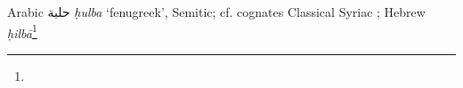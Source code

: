 \begin{etymology}\label{ety:hulba}
Arabic {حلبة} \textit{ḥulba} `fenugreek', Semitic; cf. cognates Classical Syriac ; Hebrew ‎ \textit{ḥilbā}\footnote{}
\end{etymology}